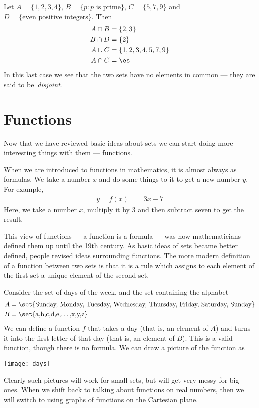 \begin{eg}\label{eg_0_3_3}
Let $A = \{1,2,3,4 \}$, $B = \{p : p \mbox{ is prime} \}$,
$C = \{5,7,9\}$ and $D = \{\mbox{even positive integers}\}$. Then
\begin{align*}
  A \cap B &= \{2,3\} \\
  B \cap D &= \{2 \} \\
  A \cup C &= \{1,2,3,4,5,7,9\} \\
  A \cap C &= \es
\end{align*}
In this last case we see that the two sets have no elements in common --- they
are said to be~\emph{disjoint}.
\end{eg}

\section{Functions}\label{sec_0_4}
Now that we have reviewed basic ideas about sets we can start doing more
interesting things with them --- functions.

When we are introduced to functions in mathematics, it is almost always as
formulas. We take a number $x$ and do some things to it to get a new number
$y$. For example,
\begin{align*}
  y = f(x) &= 3x-7
\end{align*}
Here, we take a number $x$, multiply it by 3 and then subtract seven to get the
result.

This view of functions --- a function is a formula --- was how mathematicians
defined them up until the 19th century. As basic ideas of sets became better
defined, people revised ideas surrounding functions. The more modern definition of a
function between two sets is that it is a rule which assigns to each element of the first
set a unique element of the second set.

Consider the set of days of the week, and the set containing the alphabet
\begin{align*}
  A &= \set{\text{Sunday, Monday, Tuesday, Wednesday, Thursday, Friday,
Saturday, Sunday}}\\
  B &= \set{\text{a,b,c,d,e,\dots,x,y,z}}
\end{align*}
We can define a function $f$ that takes a day (that is, an element of $A$) and
turns it into the first letter of that day (that is, an element of $B$). This
is a valid function, though there is no formula. We can draw a picture
of the function as
\begin{fig}
\begin{center}
 \texttt{[image: days]}
\end{center}
\end{fig}
Clearly such pictures will work for small sets, but will get very messy for
big ones. When we shift back to talking about functions on real numbers, then we
will switch to using graphs of functions on the Cartesian plane.

